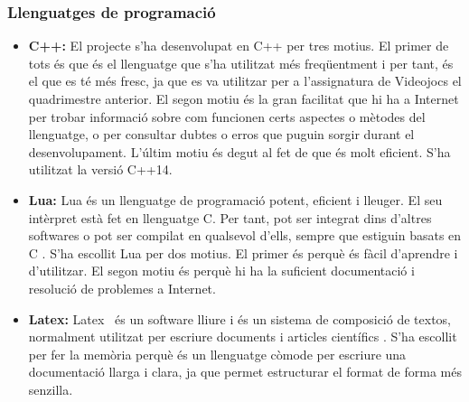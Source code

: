 \documentclass[a4paper]{article}
\begin{document}
\subsubsection{Llenguatges de programació}
\begin{itemize}
    \item \textbf{C++:} El projecte s'ha desenvolupat en C++ per tres motius. El primer de tots és que és el llenguatge que s'ha utilitzat més freqüentment i per tant, és el que es té més fresc, ja que es va utilitzar per a l'assignatura de Videojocs el quadrimestre anterior. El segon motiu és la gran facilitat que hi ha a Internet per trobar informació sobre com funcionen certs aspectes o mètodes del llenguatge, o per consultar dubtes o erros que puguin sorgir durant el desenvolupament. L'últim motiu és degut al fet de que és molt eficient. S'ha utilitzat la versió C++14.
    \item \textbf{Lua:} Lua és un llenguatge de programació potent, eficient i lleuger. El seu intèrpret està fet en llenguatge C. Per tant, pot ser integrat dins d'altres softwares o pot ser compilat en qualsevol d'ells, sempre que estiguin basats en C \cite{luaAbout}. S'ha escollit Lua per dos motius. El primer és perquè és fàcil d'aprendre i d'utilitzar. El segon motiu és perquè hi ha la suficient documentació i resolució de problemes a Internet. 
    \item \textbf{Latex:} Latex \, és un software lliure i és un sistema de composició de textos, normalment utilitzat per escriure documents i articles científics \cite{wikipediaLatex}. S'ha escollit per fer la memòria perquè és un llenguatge còmode per escriure una documentació llarga i clara, ja que permet estructurar el format de forma més senzilla.
\end{itemize}
\end{document}
